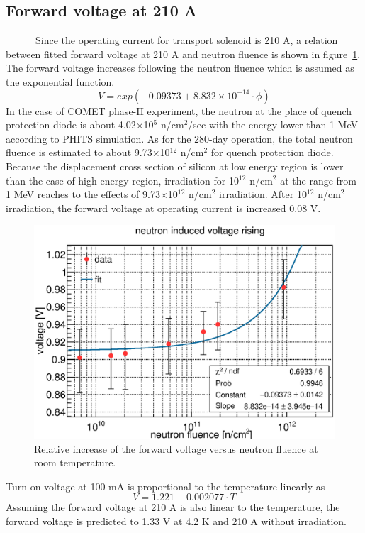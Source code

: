 \subsection{Forward voltage at 210 A}
~~~~~~Since the operating current for transport solenoid is 210 A, a relation between fitted forward voltage at 210 A and neutron fluence is shown in figure~\ref{3diode}.
The forward voltage increases following the neutron fluence which is assumed as the exponential function.
\begin{equation}
 V = exp(-0.09373 + 8.832 \times 10^{-14} \cdot \phi)
\end{equation}
In the case of COMET phase-II experiment, the neutron at the place of quench protection diode is about 4.02$\times$10$^5$ n/cm$^2$/sec with the energy lower than 1 MeV  according to PHITS simulation.
As for the 280-day operation, the total neutron fluence is estimated to about 9.73$\times$10$^{12}$ n/cm$^2$ for quench protection diode.
Because the displacement cross section of silicon at low energy region is lower than the case of high energy region, irradiation for 10$^{12}$ n/cm$^2$ at the range from 1 MeV reaches to the effects of 9.73$\times$10$^{12}$ n/cm$^2$ irradiation.
After 10$^{12}$ n/cm$^2$ irradiation, the forward voltage at operating current is increased 0.08 V.
  \begin{figure}[H]
   \centering
   \includegraphics[scale=0.5]{chapter4/fig/dioderesult.eps}
   \caption{Relative increase of the forward voltage versus neutron fluence at room temperature.}
   \label{3diode}
  \end{figure}

Turn-on voltage at 100 mA is proportional to the temperature linearly as
\begin{equation}
 V = 1.221 - 0.002077 \cdot T
\end{equation}
Assuming the forward voltage at 210 A is also linear to the temperature, the forward voltage is predicted to 1.33 V at 4.2 K and 210 A without irradiation.

